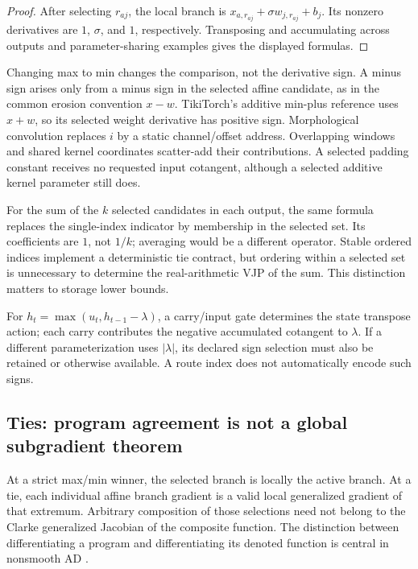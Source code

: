 \begin{proof}
After selecting $r_{aj}$, the local branch is
$x_{a,r_{aj}}+\sigma w_{j,r_{aj}}+b_j$. Its nonzero derivatives are $1$,
$\sigma$, and $1$, respectively. Transposing and accumulating across outputs
and parameter-sharing examples gives the displayed formulas.
\end{proof}

Changing max to min changes the comparison, not the derivative sign. A minus
sign arises only from a minus sign in the selected affine candidate, as in
the common erosion convention $x-w$. TikiTorch's additive min-plus reference
uses $x+w$, so its selected weight derivative has positive sign.
Morphological convolution replaces $i$ by a static channel/offset address.
Overlapping windows and shared kernel coordinates scatter-add their
contributions. A selected padding constant receives no requested input
cotangent, although a selected additive kernel parameter still does.

For the sum of the $k$ selected candidates in each output, the same formula
replaces the single-index indicator by membership in the selected set. Its
coefficients are $1$, not $1/k$; averaging would be a different operator.
Stable ordered indices implement a deterministic tie contract, but ordering
within a selected set is unnecessary to determine the real-arithmetic VJP of
the sum. This distinction matters to storage lower bounds.

For $h_t=\max(u_t,h_{t-1}-\lambda)$, a carry/input gate determines the state
transpose action; each carry contributes the negative accumulated cotangent
to $\lambda$. If a different parameterization uses $|\lambda|$, its declared
sign selection must also be retained or otherwise available. A route index
does not automatically encode such signs.

\subsection{Ties: program agreement is not a global subgradient theorem}
\label{app:ties}

At a strict max/min winner, the selected branch is locally the active branch.
At a tie, each individual affine branch gradient is a valid local generalized
gradient of that extremum. Arbitrary composition of those selections need
not belong to the Clarke generalized Jacobian of the composite function.
The distinction between differentiating a program and differentiating its
denoted function is central in nonsmooth AD \citep{bolte2020model}.


